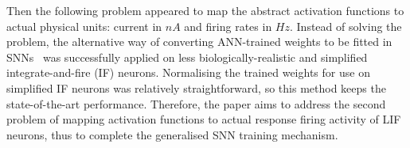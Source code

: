 \documentclass{article}
\begin{document}
Then the following problem appeared to map the abstract activation functions to actual physical units: current in $nA$ and firing rates in $Hz$.
Instead of solving the problem, the alternative way of converting ANN-trained weights to be fitted in SNNs~\cite{cao2015spiking,diehl2015fast} was successfully applied 
on less biologically-realistic and simplified integrate-and-fire (IF) neurons.
Normalising the trained weights for use on simplified IF neurons was relatively straightforward, so this method keeps the state-of-the-art performance.
Therefore, the paper aims to address the second problem of mapping activation functions to actual response firing activity of LIF neurons, thus to complete the generalised SNN training mechanism.




\end{document}
